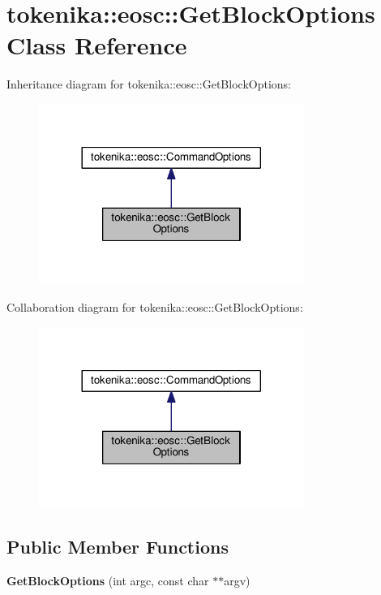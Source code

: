 \hypertarget{classtokenika_1_1eosc_1_1_get_block_options}{}\section{tokenika\+:\+:eosc\+:\+:Get\+Block\+Options Class Reference}
\label{classtokenika_1_1eosc_1_1_get_block_options}


Inheritance diagram for tokenika\+:\+:eosc\+:\+:Get\+Block\+Options\+:
\nopagebreak
\begin{figure}[H]
\begin{center}
\leavevmode
\includegraphics[width=245pt]{classtokenika_1_1eosc_1_1_get_block_options__inherit__graph}
\end{center}
\end{figure}


Collaboration diagram for tokenika\+:\+:eosc\+:\+:Get\+Block\+Options\+:
\nopagebreak
\begin{figure}[H]
\begin{center}
\leavevmode
\includegraphics[width=245pt]{classtokenika_1_1eosc_1_1_get_block_options__coll__graph}
\end{center}
\end{figure}
\subsection*{Public Member Functions}
\begin{DoxyCompactItemize}
\item 
\mbox{\label{classtokenika_1_1eosc_1_1_get_block_options_ab031795a5bd5cf681307cc9ea07659a3}} 
{\bfseries Get\+Block\+Options} (int argc, const char $\ast$$\ast$argv)
\end{DoxyCompactItemize}
